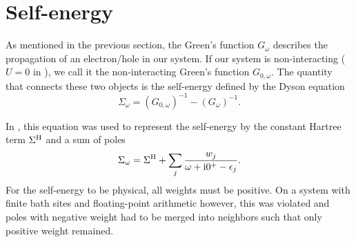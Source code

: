 \section{Self-energy}
\label{sec:self-energy}

As mentioned in the previous section,
the Green's function $G_\omega$ describes the propagation of an electron/hole in our system.
If our system is non-interacting ($U=0$ in ),
we call it the non-interacting Green's function $G_{0, \omega}$.
The quantity that connects these two objects is the self-energy defined by the Dyson equation
\begin{equation}
    \Sigma_\omega = (G_{0, \omega})^{-1} - (G_\omega)^{-1}.
    \label{eq:dyson}
\end{equation}

In \cite{Lu2014},
this equation was used to represent the self-energy by the constant Hartree term $\Sigma^{\mathrm{H}}$
and a sum of poles
\begin{equation}
    \Sigma_\omega = \Sigma^{\mathrm{H}} + \sum_j \frac{w_j}{\omega + \mathrm{i}0^+ - \epsilon_j}.
    \label{eq:self-energy-sum-of-poles}
\end{equation}
For the self-energy to be physical, all weights must be positive.
On a system with finite bath sites and floating-point arithmetic however,
this was violated and poles with negative weight had to be merged into neighbors
such that only positive weight remained.

